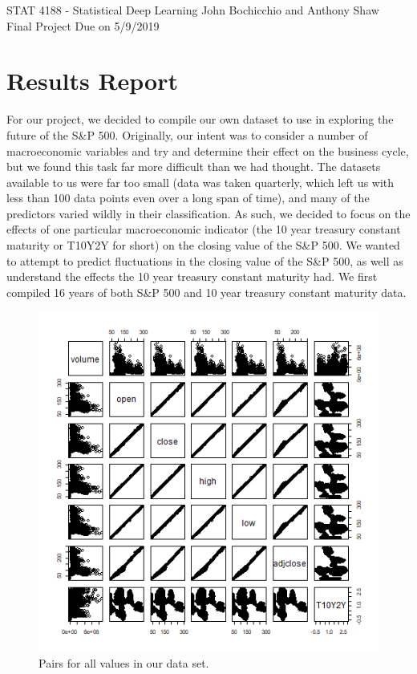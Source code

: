 \documentclass[12pt]{article}
\begin{document}
\pagestyle{plain}
\begin{center}
STAT 4188 - Statistical Deep Learning  \hfill John Bochicchio and Anthony Shaw \\
Final Project \hfill  Due on 5/9/2019
\end{center}
\section{Results Report}
\tab For our project, we decided to compile our own dataset to use in exploring the future of the S\&P 500. Originally, our intent was to consider a number of macroeconomic variables and try and determine their effect on the business cycle, but we found this task far more difficult than we had thought. The datasets available to us were far too small (data was taken quarterly, which left us with less than 100 data points even over a long span of time), and many of the predictors varied wildly in their classification. As such, we decided to focus on the effects of one particular macroeconomic indicator (the 10 year treasury constant maturity or T10Y2Y for short) on the closing value of the S\&P 500. We wanted to attempt to predict fluctuations in the closing value of the S\&P 500, as well as understand the effects the 10 year treasury constant maturity had. We first compiled 16 years of both S\&P 500 and 10 year treasury constant maturity data.

\begin{figure}[H]
\centering
\includegraphics[scale=.5]{images/SPY-pairs.png}
\caption{Pairs for all values in our data set.}
\end{figure}
\end{document}
